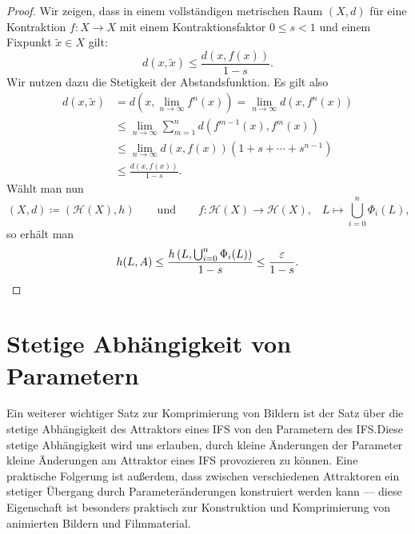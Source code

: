 \documentclass[afourpaper]{latex-classes/handout}
\begin{document}
\begin{proof}{}
  Wir zeigen, dass in einem vollständigen metrischen Raum \( (X, d) \) für eine Kontraktion \( f: X \to X \) mit einem Kontraktionsfaktor \( 0 \leq s < 1 \) und einem Fixpunkt \( \widetilde{x} \in X \) gilt:
  \begin{equation*}
    d(x,\widetilde{x}) \leq \frac{d(x,f(x))}{1-s}\text{.}
  \end{equation*} 
  Wir nutzen dazu die Stetigkeit der Abstandsfunktion. Es gilt also
  \begin{align*}
    d(x,\widetilde{x}) &= d\left( x, \underset{n \to \infty}{\lim} f^n(x) \right) = \underset{n \to \infty}{\lim}d(x,f^n(x)) \\
    &\leq \underset{n \to \infty}{\lim}\sum_{m = 1}^n d(f^{m-1}(x),f^m(x)) \\
    &\leq \underset{n \to \infty}{\lim} d(x,f(x))(1+s+\cdots+s^{n-1}) \\
    &\leq \frac{d(x,f(x))}{1-s}\text{.}
  \end{align*}
  Wählt man nun
  \begin{equation*}
    (X,d) \coloneqq (\mathcal{H}(X), h) \qquad \text{und} \qquad f : \mathcal{H}(X) \to \mathcal{H}(X)\text{,} \quad L \mapsto \bigcup_{i=0}^n \Phi_i(L)\text{,}
  \end{equation*}
  so erhält man
  \begin{equation*}
    h(L, A) \leq \frac{h\left( L, \bigcup_{i=0}^n \Phi_i(L) \right)}{1-s} \leq \frac{\epsilon}{1-s}\text{.}\qed
  \end{equation*}
\end{proof}

\section{Stetige Abhängigkeit von Parametern}

Ein weiterer wichtiger Satz zur Komprimierung von Bildern ist der Satz über die stetige Abhängigkeit des Attraktors eines IFS von den Parametern des IFS.\@ Diese stetige Abhängigkeit wird uns erlauben, durch kleine Änderungen der Parameter kleine Änderungen am Attraktor eines IFS provozieren zu können. Eine praktische Folgerung ist außerdem, dass zwischen verschiedenen Attraktoren ein stetiger Übergang durch Parameteränderungen konstruiert werden kann --- diese Eigenschaft ist besonders praktisch zur Konstruktion und Komprimierung von animierten Bildern und Filmmaterial.
\end{document}
